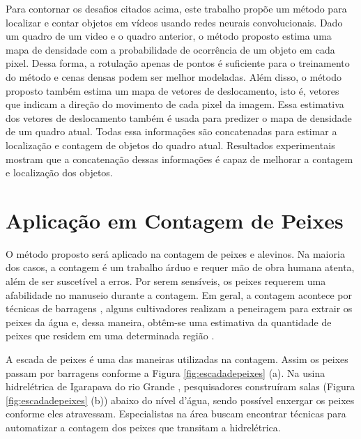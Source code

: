     Para contornar os desafios citados acima, este trabalho propõe um método para localizar e contar objetos em vídeos usando redes neurais convolucionais.
    Dado um quadro de um video e o quadro anterior, o método proposto estima uma mapa de densidade com a probabilidade de ocorrência de um objeto em cada pixel.
    Dessa forma, a rotulação apenas de pontos é suficiente para o treinamento do método e cenas densas podem ser melhor modeladas.
    Além disso, o método proposto também estima um mapa de vetores de deslocamento, isto é, vetores que indicam a direção do movimento de cada pixel da imagem.
    Essa estimativa dos vetores de deslocamento também é usada para predizer o mapa de densidade de um quadro atual.
    Todas essa informações são concatenadas para estimar a localização e contagem de objetos do quadro atual.
    Resultados experimentais mostram que a concatenação dessas informações é capaz de melhorar a contagem e localização dos objetos.













\section{Aplicação em Contagem de Peixes}
\label{sec:Aplicação}


O método proposto será aplicado na contagem de peixes e alevinos. Na maioria dos casos, a contagem é um trabalho árduo e requer mão de obra humana atenta, além de ser suscetível a erros.
Por serem sensíveis, os peixes requerem uma afabilidade no manuseio durante a contagem.
Em geral, a contagem acontece por técnicas de barragens \cite{Erikson}, alguns cultivadores realizam a peneiragem para extrair os peixes da água e, dessa maneira, obtêm-se uma estimativa da quantidade de peixes que residem em uma determinada região \cite{OECD,FAO}.


A escada de peixes é uma das maneiras utilizadas na contagem.
Assim os peixes passam por barragens conforme a Figura \ref{fig:escadadepeixes} (a). Na usina hidrelétrica de Igarapava do rio Grande \cite{UHE}, pesquisadores construíram salas (Figura \ref{fig:escadadepeixes} (b)) abaixo do nível d'água, sendo possível enxergar os peixes conforme eles atravessam.
Especialistas na área buscam encontrar técnicas para automatizar a contagem dos peixes que transitam a hidrelétrica.


